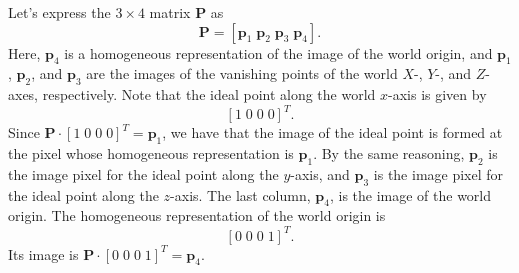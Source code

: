 \documentclass{article}
\begin{document}
Let's express the $3 \times 4$ matrix $\mathbf{P}$ as
\[
\mathbf{P} = [\mathbf{p}_1 \; \mathbf{p}_2 \; \mathbf{p}_3 \; \mathbf{p}_4].
\]
Here, $\mathbf{p}_4$ is a homogeneous representation of the image of the world origin, and $\mathbf{p}_1$, $\mathbf{p}_2$, and $\mathbf{p}_3$ are the images of the vanishing points of the world $X$-, $Y$-, and $Z$-axes, respectively. Note that the ideal point along the world $x$-axis is given by
\[
[1 \; 0 \; 0 \; 0]^T.
\]
Since $\mathbf{P} \cdot [1 \; 0 \; 0 \; 0]^T = \mathbf{p}_1$, we have that the image of the ideal point is formed at the pixel whose homogeneous representation is $\mathbf{p}_1$. By the same reasoning, $\mathbf{p}_2$ is the image pixel for the ideal point along the $y$-axis, and $\mathbf{p}_3$ is the image pixel for the ideal point along the $z$-axis. The last column, $\mathbf{p}_4$, is the image of the world origin. The homogeneous representation of the world origin is
\[
[0 \; 0 \; 0 \; 1]^T.
\]
Its image is $\mathbf{P} \cdot [0 \; 0 \; 0 \; 1]^T = \mathbf{p}_4$.
\end{document}
